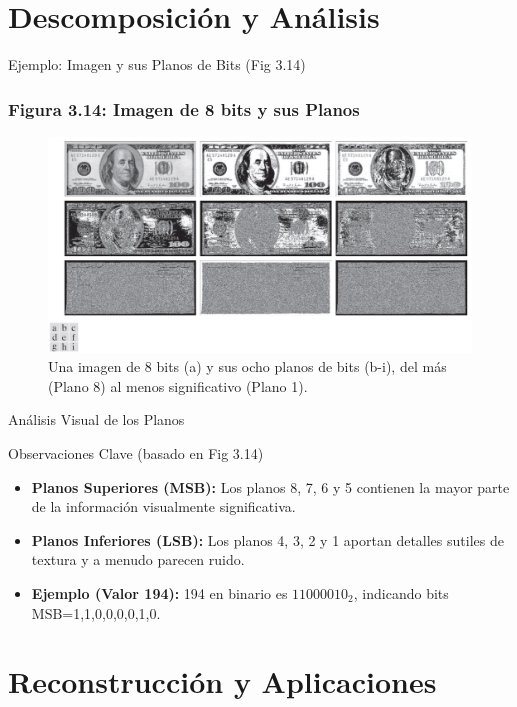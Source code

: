 \documentclass{beamer}
\begin{document}
\section{Descomposición y Análisis}

\begin{frame}{Ejemplo: Imagen y sus Planos de Bits (Fig 3.14)}
  \frametitle{Figura 3.14: Imagen de 8 bits y sus Planos}

  \begin{figure}
    \centering
      \includegraphics[width=\linewidth]{figuras/Fig_3_14.png}
    \caption{Una imagen de 8 bits (a) y sus ocho planos de bits (b-i), del más (Plano 8) al menos significativo (Plano 1).}
  \end{figure}
\end{frame}

\begin{frame}{Análisis Visual de los Planos}
  \begin{block}{Observaciones Clave (basado en Fig 3.14)}
    \begin{itemize}
      \item \textbf{Planos Superiores (MSB):} Los planos 8, 7, 6 y 5 contienen la mayor parte de la información visualmente significativa.
      \item \textbf{Planos Inferiores (LSB):} Los planos 4, 3, 2 y 1 aportan detalles sutiles de textura y a menudo parecen ruido.
      \item \textbf{Ejemplo (Valor 194):} 194 en binario es $11000010_2$, indicando bits MSB=1,1,0,0,0,0,1,0.
    \end{itemize}
  \end{block}
\end{frame}

\section{Reconstrucción y Aplicaciones}
\end{document}
